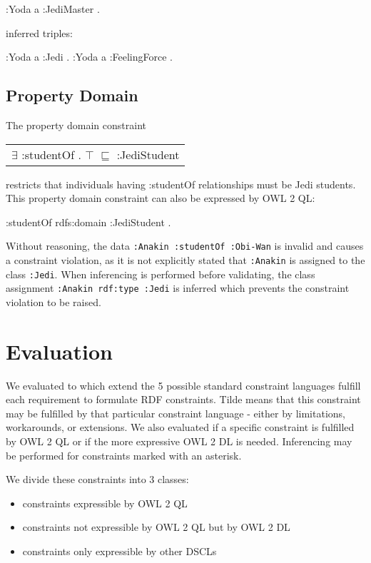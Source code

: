 \documentclass{llncs}
\newcommand{\ms}[1]{\texttt{#1}}
\newenvironment{DL}{
  \scriptsize
  \sffamily
  \vspace{0.3cm}
  \begin{tabular}{l}

}{
  \end{tabular}
  \linebreak
}
\begin{document}
:Yoda a :JediMaster . 

inferred triples:

:Yoda a :Jedi . 
:Yoda a :FeelingForce . 

\subsection{Property Domain}

The property domain constraint

\begin{DL}
$\exists$ :studentOf . $\top$ $\sqsubseteq$ :JediStudent \\
\end{DL}

restricts that individuals having :studentOf relationships must be Jedi students.
This property domain constraint can also be expressed by OWL 2 QL:

\begin{ex}
:studentOf rdfs:domain :JediStudent .
\end{ex}

Without reasoning, the data \ms{:Anakin :studentOf :Obi-Wan} is invalid and causes a constraint violation, as it is not explicitly stated that \ms{:Anakin} is assigned to the class \ms{:Jedi}. 
When inferencing is performed before validating, the class assignment \ms{:Anakin rdf:type :Jedi} is inferred which prevents the constraint violation to be raised.

\section{Evaluation}

We evaluated to which extend the 5 possible standard constraint languages fulfill each requirement to formulate RDF constraints.
Tilde means that this constraint may be fulfilled by that particular constraint language - either by limitations, workarounds, or extensions.
We also evaluated if a specific constraint is fulfilled by OWL 2 QL or if the more expressive OWL 2 DL is needed. 
Inferencing may be performed for constraints marked with an asterisk. 

We divide these constraints into 3 classes:

\begin{itemize}
	\item constraints expressible by OWL 2 QL
	\item constraints not expressible by OWL 2 QL but by OWL 2 DL
	\item constraints only expressible by other DSCLs
\end{itemize}
 
\end{document}
